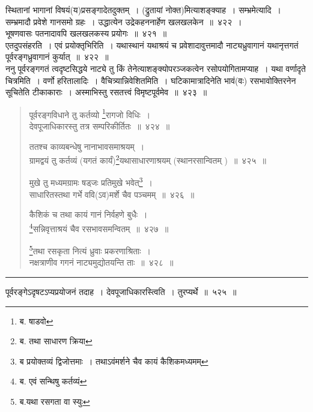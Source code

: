 \documentclass[11pt, openany]{book}
\begin{document}
{\qtt स्थितानां भागानां} विषयं(य)प्रसङ्गादेतदुक्तम्~। (द्रुतायां नोक्त)मित्याशङ्क्याह~। {\qtt सम्भ्रमेत्यादि}~। सम्भ्रमादौ प्रवेशे गानसमो ग्रहः~। उद्धात्येन उद्रेकहननार्हेण खलखलकेन~॥~४२२~।\\

{\qtt भूषणवासः पतनादावपि} खलखलकस्य प्रयोगः~॥~४२१~॥\\

{\qtt एतदुपसंहरति}~। एवं प्रयोक्तृभिरिति~। यथास्थानं यथाश्रयं च प्रवेशादावुत्तमादौ नाट्यध्रुवागानं यथानृत्तगतं पूर्वरङ्गध्रुवागानं कुर्यात्~॥~४२२~॥\\

ननु पूर्वरङ्गगतं त्वदृष्टसिद्धये नाट्ये तु किं तेनेत्याशङ्क्योपरञ्जकत्वेन रसोपयोगितामप्याह~। यथा {\qtt वर्णादृते चित्रमिति}~। वर्णो हरितालादिः~। वैचित्र्यान्निवेशितमिति~। घटिकामात्रादिनेति भावं(वः) रसभावोक्तिरनेन सूचितेति टीकाकाराः~। अस्माभिस्तु रसतत्त्वं विमृष्टपूर्वमेव~॥~४२३~॥

\newpage

\begin{quote}
{\na पूर्वरङ्गविधाने तु कर्तव्यो \renewcommand{\thefootnote}{1}\footnote{ब. षाडवो}रागजो विधिः~।\\
 देवपूजाधिकारस्तु तत्र सम्परिकीर्तितः~॥~४२४~॥

 ततश्च काव्यबन्धेषु नानाभावसमाश्रयम्~।\\
 ग्रामद्वयं तु कर्तव्यं (यगतं कार्यं)\renewcommand{\thefootnote}{2}\footnote{ब. तथा साधारण क्रिया}यथासाधारणाश्रयम् (स्थानरसान्वितम् )~॥~४२५~॥

 मुखे तु मध्यमग्रामः षड्जः प्रतिमुखे भवेत्\renewcommand{\thefootnote}{3}\footnote{ब प्रयोक्तव्यं द्विजोत्तमाः~। तथाऽवंमर्शने चैव कायं कैशिकमध्यमम्}~।\\
 साधारितस्तथा गर्भे ववि(ऽव)मर्शे चैव पञ्चमम्~॥~४२६~॥

 कैशिकं च तथा कायं गानं निर्वहणे बुधैः~।\\
 \renewcommand{\thefootnote}{4}\footnote{ब. एवं सन्थिषु कर्तव्यं}सन्निवृत्ताश्रयं चैव रसभावसमन्वितम्~॥~४२७~॥

 \renewcommand{\thefootnote}{5}\footnote{ब.यथा रसगता वा स्युः}तथा रसकृता नित्यं ध्रुवाः प्रकरणाश्रिताः~।\\
 नक्षत्राणीव गगनं नाट्यमुद्योतयन्ति ताः~॥~४२८~॥}
\end{quote}

\hrule

\vspace{2mm}
{\qtt पूर्वरङ्गेऽदृषटऽप्यप्रयोजनं} तदाह~। {\qtt देवपूजाधिकारस्त्विति}~। तुरप्यर्थे~॥~५२५~॥\\
\end{document}

